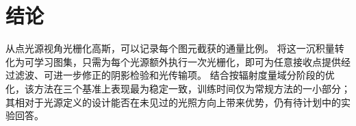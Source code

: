 \section{结论}
\label{sec:conclusion}

从点光源视角光栅化高斯，可以记录每个图元截获的通量比例。
\ours 将这一沉积量转化为可学习图集，只需为每个光源额外执行一次光栅化，即可为任意接收点提供经过滤波、可进一步修正的阴影检验和光传输项。
结合按辐射度量域分阶段的优化，该方法在三个基准上表现最为稳定一致，训练时间仅为常规方法的一小部分；其相对于光源定义的设计能否在未见过的光照方向上带来优势，仍有待计划中的实验回答。
